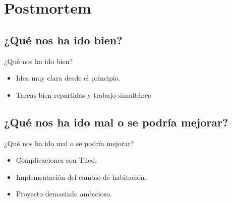 \documentclass{beamer}
\begin{document}
\section{Postmortem}

\subsection{¿Qué nos ha ido bien?}

\begin{frame}{¿Qué nos ha ido bien?}
	\begin{itemize}
		\item Idea muy clara desde el principio.
		\item Tareas bien repartidas y trabajo simultáneo
	\end{itemize}
\end{frame}

\subsection{¿Qué nos ha ido mal o se podría mejorar?}

\begin{frame}{¿Qué nos ha ido mal o se podría mejorar?}
	\begin{itemize}
		\item Complicaciones con Tiled.
		\item Implementación del cambio de habitación.
		\item Proyecto demasiado ambicioso.
	\end{itemize}
\end{frame}
\end{document}
